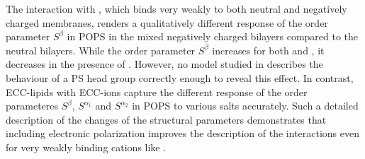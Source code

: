 The interaction with , which binds very weakly to both neutral and negatively charged membranes, 
renders a qualitatively different response of the order parameter $S^\beta$ in POPS in the mixed negatively charged bilayers compared to the neutral bilayers. 
While the order parameter $S^\beta$ increases for both  and ,
it decreases in the presence of .
However, no model studied in \citep{nmrlipids_proj4} describes the behaviour of a PS head group correctly enough to reveal this effect. 
In contrast, ECC-lipids with ECC-ions capture the different response of the order parameteres $S^{\beta}$, $S^{\alpha _1}$ and $S^{\alpha _2}$ in POPS to various salts accurately. 
Such a detailed description of the changes of the structural parameters 
demonstrates that including electronic polarization
improves the description of the interactions even for very weakly binding cations like . 



